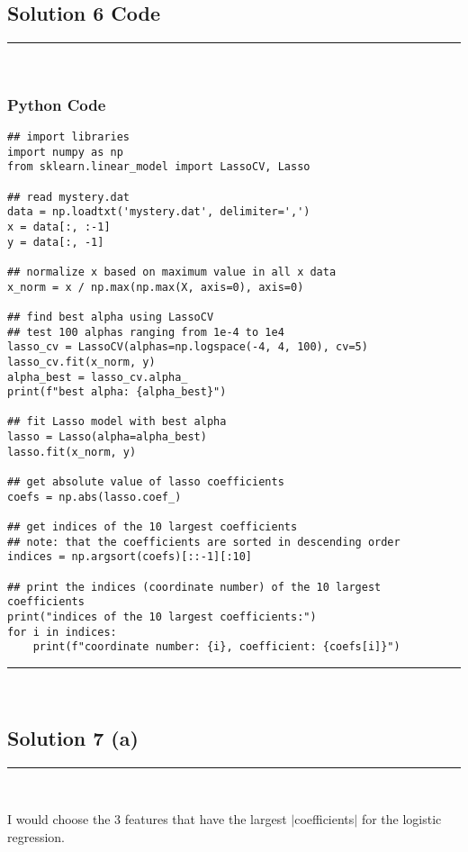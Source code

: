 \documentclass{article}
\begin{document}
\newpage

\subsection*{Solution 6 Code}
\noindent\rule{\textwidth}{0.4pt}\\

\subsubsection*{Python Code}

\begin{lstlisting}
## import libraries
import numpy as np
from sklearn.linear_model import LassoCV, Lasso

## read mystery.dat
data = np.loadtxt('mystery.dat', delimiter=',')
x = data[:, :-1]
y = data[:, -1]

## normalize x based on maximum value in all x data
x_norm = x / np.max(np.max(X, axis=0), axis=0)

## find best alpha using LassoCV
## test 100 alphas ranging from 1e-4 to 1e4
lasso_cv = LassoCV(alphas=np.logspace(-4, 4, 100), cv=5)
lasso_cv.fit(x_norm, y)
alpha_best = lasso_cv.alpha_
print(f"best alpha: {alpha_best}")

## fit Lasso model with best alpha
lasso = Lasso(alpha=alpha_best)
lasso.fit(x_norm, y)

## get absolute value of lasso coefficients
coefs = np.abs(lasso.coef_)

## get indices of the 10 largest coefficients
## note: that the coefficients are sorted in descending order
indices = np.argsort(coefs)[::-1][:10]

## print the indices (coordinate number) of the 10 largest coefficients
print("indices of the 10 largest coefficients:")
for i in indices:
    print(f"coordinate number: {i}, coefficient: {coefs[i]}")

\end{lstlisting}


\noindent\rule{\textwidth}{0.4pt}\\

\newpage

\subsection*{Solution 7 (a)}
\noindent\rule{\textwidth}{0.4pt}\\

\parbox{\textwidth}{
I would choose the 3 features that have the largest $|$coefficients$|$ for the logistic regression.
}\\
\end{document}
